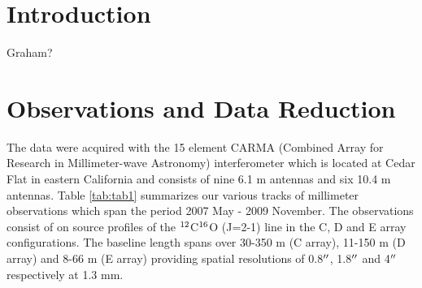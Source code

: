 \documentclass[manuscript]{aastex}
\begin{document}




\section{Introduction}

Graham?

\section{Observations and Data Reduction}

The data were acquired with the 15 element CARMA (Combined Array for Research in Millimeter-wave Astronomy) \citep{scot04} interferometer which is located at Cedar Flat in eastern California and consists of nine 6.1 m antennas and six 10.4 m antennas. Table \ref{tab:tab1} summarizes our various tracks of millimeter observations which span the period 2007 May - 2009 November. The observations consist of on source profiles of the $\rm{{}^{12}}$C$\rm{{}^{16}}$O (J=2-1) line in the C, D and E array configurations. The baseline length spans over 30-350 m (C array), 11-150 m (D array) and 8-66 m (E array) providing spatial resolutions of 0.8$\mbox{$^{\prime\prime}$}$, 1.8$\mbox{$^{\prime\prime}$}$ and 4$\mbox{$^{\prime\prime}$}$ respectively at 1.3 mm. 
\end{document}
